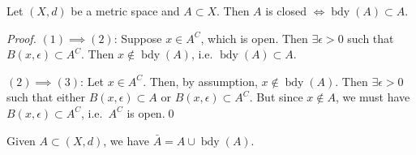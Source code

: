 \documentclass[notoc,notitlepage]{tufte-book}
\DeclareMathOperator{\bdy}{bdy }
\begin{document}
\begin{propo}\label{propo:closed_sets_include_its_boundary_points}
  Let $(X, d)$ be a metric space and $A \subset X$. Then $A$ is closed $\iff \bdy(A) \subset A$.
\end{propo}

\begin{proof}
  $(1) \implies (2)$: Suppose $x \in A^C$, which is open. Then $\exists \epsilon > 0$ such that $B(x, \epsilon) \subset A^C$. Then $x \notin \bdy(A)$, i.e. $\bdy(A) \subset A$.

  \noindent$(2) \implies (3)$: Let $x \in A^C$. Then, by assumption, $x \notin \bdy(A)$. Then $\exists \epsilon > 0$ such that either $B(x, \epsilon) \subset A$ or $B(x, \epsilon) \subset A^C$. But since $x \notin A$, we must have $B(x, \epsilon) \subset A^C$, i.e.\ $A^C$ is open.\qed\
\end{proof}

\begin{propo}\label{propo:closures_include_the_boundary_points_of_a_set}
  Given $A \subset (X, d)$, we have $\bar{A} = A \cup \bdy(A)$.
\end{propo}
\end{document}

